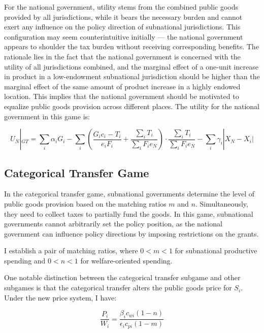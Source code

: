 For the national government, utility stems from the combined public goods provided by all jurisdictions, while it bears the necessary burden and cannot exert any influence on the policy direction of subnational jurisdictions. This configuration may seem counterintuitive initially — the national government appears to shoulder the tax burden without receiving corresponding benefits. The rationale lies in the fact that the national government is concerned with the utility of all jurisdictions combined, and the marginal effect of a one-unit increase in product in a low-endowment subnational jurisdiction should be higher than the marginal effect of the same amount of product increase in a highly endowed location. This implies that the national government should be motivated to equalize public goods provision across different places. The utility for the national government in this game is: %

\begin{equation}
    U_N|_{GT}=\sum_i \alpha_i G_i-\sum_i(\frac{G_ic_i-T_i}{e_iF_i}+\frac{\sum_iT_i}{\sum_iF_ie_N})\cdot \frac{\sum_iT_i}{\sum_iF_ie_N}-\sum_i \gamma_i|X_N-X_i|
\end{equation}

\subsection{Categorical Transfer Game}

In the categorical transfer game, subnational governments determine the level of public goods provision based on the matching ratios $m$ and $n$. Simultaneously, they need to collect taxes to partially fund the goods. In this game, subnational governments cannot arbitrarily set the policy position, as the national government can influence policy directions by imposing restrictions on the grants.

I establish a pair of matching ratios, where $0 < m < 1$ for subnational productive spending and $0 < n < 1$ for welfare-oriented spending.

One notable distinction between the categorical transfer subgame and other subgames is that the categorical transfer alters the public goods price for $S_i$. Under the new price system, I have:%

\begin{equation}
    \frac{P_i}{W_i}=\frac{\beta_ic_{wi}(1-n)}{\epsilon_ic_{pi}(1-m)}
\end{equation}

